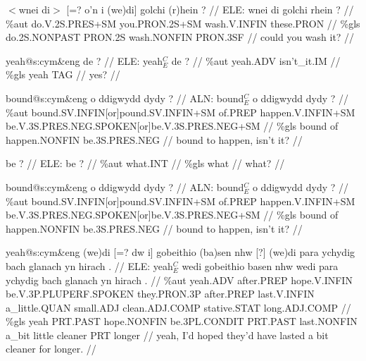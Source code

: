 \documentclass[a4paper,10pt]{article}
\begin{document}
\ex
\begingl[lingstyle=gergl]
\glchat $<$wnei di$>$ [=? o'n i (we)di] golchi (r)hein ? //
\glsurface ELE:  wnei di golchi rhein ?  //
\glauto \%aut  do{\scriptsize .V.2S.PRES+SM} you{\scriptsize .PRON.2S+SM} wash{\scriptsize .V.INFIN} these{\scriptsize .PRON}   //
\glmanual \%gls  do{\scriptsize .2S.NONPAST} PRON{\scriptsize .2S} wash{\scriptsize .NONFIN} PRON{\scriptsize .3SF}   //
\gleng could you wash it? //
\endgl
\xe

\ex
\begingl[lingstyle=gergl]
\glchat yeah@s:cym\&eng de ? //
\glsurface ELE:  yeah$^{C}_{E}$ de ?  //
\glauto \%aut  yeah{\scriptsize .ADV} isn't\_it{\scriptsize .IM}   //
\glmanual \%gls  yeah TAG   //
\gleng yes? //
\endgl
\xe

\ex
\begingl[lingstyle=gergl]
\glchat bound@s:cym\&eng o ddigwydd dydy ? //
\glsurface ALN:  bound$^{C}_{E}$ o ddigwydd dydy ?  //
\glauto \%aut  bound{\scriptsize .SV.INFIN[or]pound.SV.INFIN+SM} of{\scriptsize .PREP} happen{\scriptsize .V.INFIN+SM} be{\scriptsize .V.3S.PRES.NEG.SPOKEN[or]be.V.3S.PRES.NEG+SM}   //
\glmanual \%gls  bound of happen{\scriptsize .NONFIN} be{\scriptsize .3S.PRES.NEG}   //
\gleng bound to happen, isn't it? //
\endgl
\xe

\ex
\begingl[lingstyle=gergl]
\glchat be ? //
\glsurface ELE:  be ?  //
\glauto \%aut  what{\scriptsize .INT}   //
\glmanual \%gls  what   //
\gleng what? //
\endgl
\xe

\ex
\begingl[lingstyle=gergl]
\glchat bound@s:cym\&eng o ddigwydd dydy ? //
\glsurface ALN:  bound$^{C}_{E}$ o ddigwydd dydy ?  //
\glauto \%aut  bound{\scriptsize .SV.INFIN[or]pound.SV.INFIN+SM} of{\scriptsize .PREP} happen{\scriptsize .V.INFIN+SM} be{\scriptsize .V.3S.PRES.NEG.SPOKEN[or]be.V.3S.PRES.NEG+SM}   //
\glmanual \%gls  bound of happen{\scriptsize .NONFIN} be{\scriptsize .3S.PRES.NEG}   //
\gleng bound to happen, isn't it? //
\endgl
\xe

\ex
\begingl[lingstyle=gergl]
\glchat yeah@s:cym\&eng (we)di [=? dw i] gobeithio (ba)sen nhw [?] (we)di para ychydig bach glanach yn hirach . //
\glsurface ELE:  yeah$^{C}_{E}$ wedi gobeithio basen nhw wedi para ychydig bach glanach yn hirach .  //
\glauto \%aut  yeah{\scriptsize .ADV} after{\scriptsize .PREP} hope{\scriptsize .V.INFIN} be{\scriptsize .V.3P.PLUPERF.SPOKEN} they{\scriptsize .PRON.3P} after{\scriptsize .PREP} last{\scriptsize .V.INFIN} a\_little{\scriptsize .QUAN} small{\scriptsize .ADJ} clean{\scriptsize .ADJ.COMP} stative{\scriptsize .STAT} long{\scriptsize .ADJ.COMP}   //
\glmanual \%gls  yeah PRT{\scriptsize .PAST} hope{\scriptsize .NONFIN} be{\scriptsize .3PL.CONDIT} PRT{\scriptsize .PAST} last{\scriptsize .NONFIN} a\_bit little cleaner PRT longer    //
\gleng yeah, I'd hoped they'd have lasted a bit cleaner for longer. //
\endgl
\xe
\end{document}
